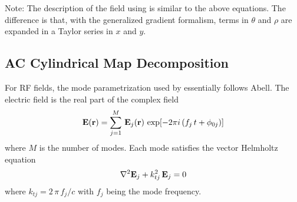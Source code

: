 Note: The description of the field using \cite{b:newton} is similar to
the above equations. The difference is that, with the generalized gradient formalism, terms in
$\theta$ and $\rho$ are expanded in a Taylor series in $x$ and $y$.

\subsection{AC Cylindrical Map Decomposition}
\label{s:cylind.ac}

For RF fields, the  mode parametrization used by \bmad essentially
follows Abell\cite{b:rf.abell}. The electric field is the real part of the complex field
\begin{equation}
  {\bf E}({\bf r}) = \sum_{j=1}^M \, {\bf E}_j({\bf r}) \, \exp[{-2 \pi i \, (f_j \, t + \phi_{0j})}]
  \label{eseei}
\end{equation}
where $M$ is the number of modes. Each mode satisfies the vector Helmholtz
equation
\begin{equation}
  \nabla^2 {\bf E}_j + k_{tj}^2 \, {\bf E}_j = 0
  \label{bke}
\end{equation}
where $k_{tj} = 2 \, \pi \, f_j/c$ with $f_j$ being the mode frequency.

